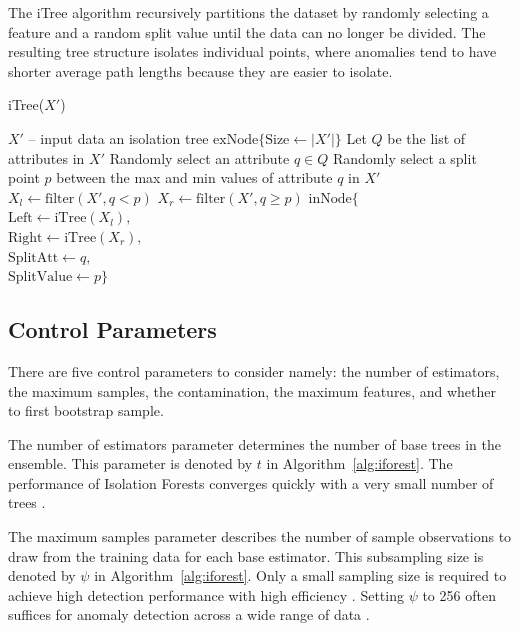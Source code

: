 \documentclass[10pt, conference]{IEEEtran}
\begin{document}
The iTree algorithm recursively partitions the dataset by randomly selecting a feature and a random split value until the data can no longer be divided. The resulting tree structure isolates individual points, where anomalies tend to have shorter average path lengths because they are easier to isolate.

\begin{algorithm}[H]
	\caption{iTree($X'$)}
	\label{alg:itree}
	\begin{algorithmic}[1]
		\Require $X'$ -- input data  
		\Ensure an isolation tree
		\Return $\text{exNode}\{\text{Size} \leftarrow |X'|\}$
		\Else
		\State Let $Q$ be the list of attributes in $X'$
		\State Randomly select an attribute $q \in Q$
		\State Randomly select a split point $p$ between the max and min values of attribute $q$ in $X'$
		\State $X_l \gets \text{filter}(X', q < p)$
		\State $X_r \gets \text{filter}(X', q \ge p)$
		\Return $\text{inNode}\{$ \\
		\hspace*{1.5em} $\text{Left} \leftarrow \text{iTree}(X_l),$ \\
		\hspace*{1.5em} $\text{Right} \leftarrow \text{iTree}(X_r),$ \\
		\hspace*{1.5em} $\text{SplitAtt} \leftarrow q,$ \\
		\hspace*{1.5em} $\text{SplitValue} \leftarrow p\}$ 
		\EndIf
	\end{algorithmic}
\end{algorithm}




\subsection{Control Parameters}
There are five control parameters to consider namely: the number of estimators, the maximum samples, the contamination, the maximum features, and whether to first bootstrap sample.

The number of estimators parameter determines the number of base trees in the ensemble. This parameter is denoted by $t$ in Algorithm~\ref{alg:iforest}. The performance of Isolation Forests converges quickly with a very small number of trees \cite{iforest}.


The maximum samples parameter describes the number of sample observations to draw from the training data for each base estimator. This subsampling size is denoted by $\psi$ in Algorithm~\ref{alg:iforest}. Only a small sampling size is required to achieve high detection performance with high efficiency \cite{iforest}. Setting $\psi$ to 256 often suffices for anomaly detection across a wide range of data \cite{iforest2}.
\end{document}
